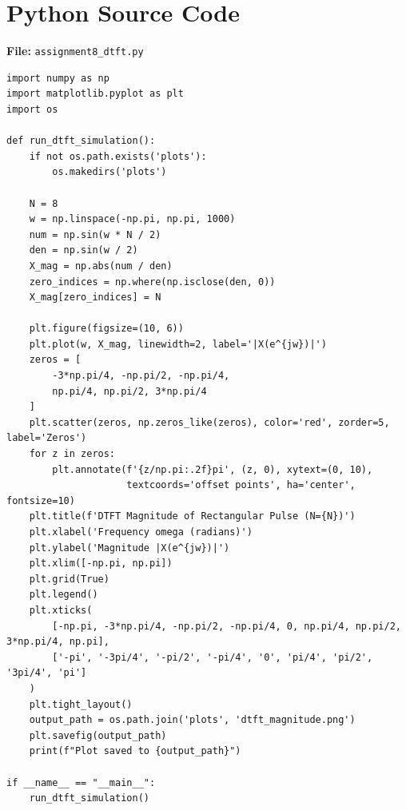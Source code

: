 \documentclass[11pt, a4paper]{article}
\begin{document}
\section{Python Source Code}
\textbf{File:} \texttt{assignment8\_dtft.py}
\begin{lstlisting}[caption={DTFT Magnitude of Rectangular Pulse -- Assignment 8}]
import numpy as np
import matplotlib.pyplot as plt
import os

def run_dtft_simulation():
    if not os.path.exists('plots'):
        os.makedirs('plots')

    N = 8
    w = np.linspace(-np.pi, np.pi, 1000)
    num = np.sin(w * N / 2)
    den = np.sin(w / 2)
    X_mag = np.abs(num / den)
    zero_indices = np.where(np.isclose(den, 0))
    X_mag[zero_indices] = N

    plt.figure(figsize=(10, 6))
    plt.plot(w, X_mag, linewidth=2, label='|X(e^{jw})|')
    zeros = [
        -3*np.pi/4, -np.pi/2, -np.pi/4,
        np.pi/4, np.pi/2, 3*np.pi/4
    ]
    plt.scatter(zeros, np.zeros_like(zeros), color='red', zorder=5, label='Zeros')
    for z in zeros:
        plt.annotate(f'{z/np.pi:.2f}pi', (z, 0), xytext=(0, 10),
                     textcoords='offset points', ha='center', fontsize=10)
    plt.title(f'DTFT Magnitude of Rectangular Pulse (N={N})')
    plt.xlabel('Frequency omega (radians)')
    plt.ylabel('Magnitude |X(e^{jw})|')
    plt.xlim([-np.pi, np.pi])
    plt.grid(True)
    plt.legend()
    plt.xticks(
        [-np.pi, -3*np.pi/4, -np.pi/2, -np.pi/4, 0, np.pi/4, np.pi/2, 3*np.pi/4, np.pi],
        ['-pi', '-3pi/4', '-pi/2', '-pi/4', '0', 'pi/4', 'pi/2', '3pi/4', 'pi']
    )
    plt.tight_layout()
    output_path = os.path.join('plots', 'dtft_magnitude.png')
    plt.savefig(output_path)
    print(f"Plot saved to {output_path}")

if __name__ == "__main__":
    run_dtft_simulation()
\end{lstlisting}
\end{document}
